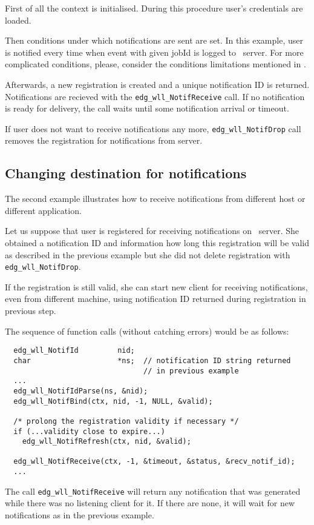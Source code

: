 First of all the context is initialised. During this procedure user's credentials are loaded. %

Then conditions under which notifications are sent are set. In this example, user is notified every time when event with given jobId is logged to \LB\ server. For more complicated conditions, please, consider the conditions limitations mentioned in \cite{lbug}.

Afterwards, a new registration is created and a unique notification ID is
returned.
Notifications are recieved with the \verb'edg_wll_NotifReceive' call.
If no notification is ready for
delivery, the call waits until some notification arrival or timeout.

If user does not want to receive notifications any more, \verb'edg_wll_NotifDrop' call removes the registration for notifications from \LB server.


\subsection{Changing destination for notifications}

The second example illustrates how to receive notifications from different host or different application.

Let us suppose that user is registered for receiving notifications on \LB\ server. She obtained a notification ID and information how long this registration will be valid as described in the previous example but she did not delete registration with \verb'edg_wll_NotifDrop'.

If the registration is still valid, she can start new client for receiving notifications, even from different machine, using notification ID returned during registration in previous step.

The sequence of function calls (without catching errors) would be as follows:

\begin{verbatim}
  edg_wll_NotifId         nid;
  char                    *ns;  // notification ID string returned
                                // in previous example
  ...
  edg_wll_NotifIdParse(ns, &nid);
  edg_wll_NotifBind(ctx, nid, -1, NULL, &valid);

  /* prolong the registration validity if necessary */
  if (...validity close to expire...)
    edg_wll_NotifRefresh(ctx, nid, &valid);

  edg_wll_NotifReceive(ctx, -1, &timeout, &status, &recv_notif_id);
  ...
\end{verbatim}

The call \verb'edg_wll_NotifReceive' will return any notification
that was generated while there was no listening client for it.
If there are none, it will wait for new notifications as in the previous
example.
